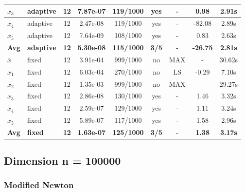 \begin{longtable}{|l|l|c|c|c|c|c|c|c|}
\hline
$x_3$ & adaptive & 12 & 7.87e-07 & 119/1000 & yes & - & 0.98 & 2.91s \\
\hline
$x_4$ & adaptive & 12 & 2.47e-08 & 119/1000 & yes & - & -82.08 & 2.89s \\
\hline
$x_5$ & adaptive & 12 & 7.64e-09 & 108/1000 & yes & - & 0.83 & 2.63s \\
\hline
\hline\hline
\textbf{Avg} & \textbf{adaptive} & \textbf{12} & \textbf{5.30e-08} & \textbf{115/1000} & \textbf{3/5} & - & \textbf{-26.75} & \textbf{2.81s} \\
\hline\hline
\hline
$\bar{x}$ & fixed & 12 & 3.91e-04 & 999/1000 & no & MAX & - & 30.62s \\
\hline
$x_1$ & fixed & 12 & 6.03e-04 & 270/1000 & no & LS & -0.29 & 7.10s \\
\hline
$x_2$ & fixed & 12 & 1.35e-03 & 999/1000 & no & MAX & - & 29.27s \\
\hline
$x_3$ & fixed & 12 & 2.86e-08 & 130/1000 & yes & - & 1.46 & 3.32s \\
\hline
$x_4$ & fixed & 12 & 2.59e-07 & 129/1000 & yes & - & 1.11 & 3.24s \\
\hline
$x_5$ & fixed & 12 & 5.89e-07 & 117/1000 & yes & - & 1.58 & 2.96s \\
\hline
\hline\hline
\textbf{Avg} & \textbf{fixed} & \textbf{12} & \textbf{1.63e-07} & \textbf{125/1000} & \textbf{3/5} & - & \textbf{1.38} & \textbf{3.17s} \\
\hline\hline
\end{longtable}


\subsection{Dimension n = 100000}

\subsubsection{Modified Newton}

